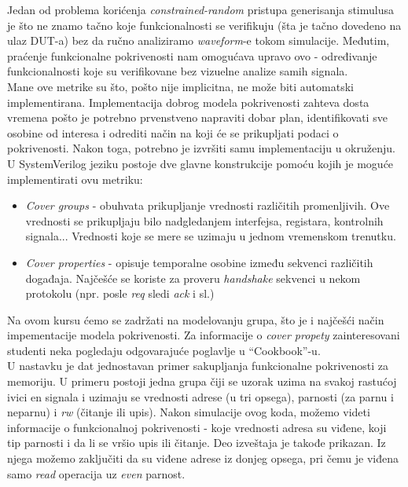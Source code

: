 Jedan od problema korićenja \emph{constrained-random} pristupa generisanja
stimulusa je što ne znamo tačno koje funkcionalnosti se verifikuju (šta je tačno
dovedeno na ulaz DUT-a) bez da ručno analiziramo \emph{waveform}-e tokom
simulacije. Međutim, praćenje funkcionalne pokrivenosti nam omogućava upravo
ovo - određivanje funkcionalnosti koje su verifikovane bez vizuelne analize
samih signala.\\

Mane ove metrike su što, pošto nije implicitna, ne može biti automatski
implementirana. Implementacija dobrog modela pokrivenosti zahteva dosta vremena
pošto je potrebno prvenstveno napraviti dobar plan, identifikovati sve osobine
od interesa i odrediti način na koji će se prikupljati podaci o pokrivenosti.
Nakon toga, potrebno je izvršiti samu implementaciju u okruženju.\\

U SystemVerilog jeziku postoje dve glavne konstrukcije pomoću kojih je moguće
implementirati ovu metriku:

\begin{itemize}
\item \emph{Cover groups} - obuhvata prikupljanje vrednosti različitih
  promenljivih. Ove vrednosti se prikupljaju bilo nadgledanjem interfejsa,
  registara, kontrolnih signala... Vrednosti koje se mere se uzimaju u jednom
  vremenskom trenutku.
\item \emph{Cover properties} - opisuje temporalne osobine između sekvenci
  različitih događaja. Najčešće se koriste za proveru \emph{handshake} sekvenci
  u nekom protokolu (npr. posle \emph{req} sledi \emph{ack} i sl.)
\end{itemize}

Na ovom kursu ćemo se zadržati na modelovanju grupa, što je i najčešći način
impementacije modela pokrivenosti. Za informacije o \emph{cover propety}
zainteresovani studenti neka pogledaju odgovarajuće poglavlje u
``Cookbook''-u.\\

U nastavku je dat jednostavan primer sakupljanja funkcionalne pokrivenosti za
memoriju. U primeru postoji jedna grupa čiji se uzorak uzima na svakoj rastućoj
ivici en signala i uzimaju se vrednosti adrese (u tri opsega), parnosti (za
parnu i neparnu) i \emph{rw} (čitanje ili upis). Nakon simulacije ovog koda,
možemo videti informacije o funkcionalnoj pokrivenosti - koje vrednosti adresa
su viđene, koji tip parnosti i da li se vršio upis ili čitanje. Deo izveštaja
je takođe prikazan. Iz njega možemo zaključiti da su viđene adrese iz donjeg
opsega, pri čemu je viđena samo \emph{read} operacija uz \emph{even} parnost.

